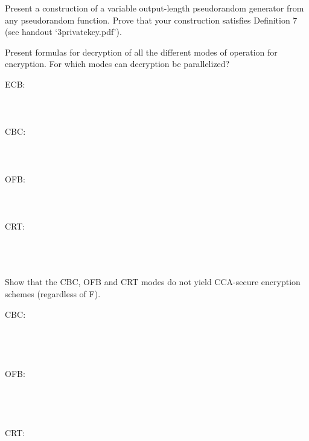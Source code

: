\documentclass[12pt,letterpaper,boxed]{amspset}
\begin{document}
\begin{problem}[3.4]
Present a construction of a variable output-length pseudorandom generator from any pseudorandom function. Prove that your construction satisfies Definition 7 (see handout `3privatekey.pdf').
\end{problem}

\begin{solution}
\vspace{5cm}
\end{solution}

\begin{problem}[3.5]
Present formulas for decryption of all the different modes of operation for encryption. For which modes can decryption be parallelized?
\end{problem}

\begin{solution}
ECB:\\
\\
\\
\\
CBC:\\
\\
\\
\\
OFB:\\
\\
\\
\\
CRT:\\
\\
\\
\\
\end{solution}

\begin{problem}[3.6]
Show that the CBC, OFB and CRT modes do not yield CCA-secure encryption schemes (regardless of F).
\end{problem}

\begin{solution}
CBC:\\
\\
\\
\\
\\
OFB:\\
\\
\\
\\
\\
CRT:\\
\\
\\
\\
\end{solution}
\end{document}
